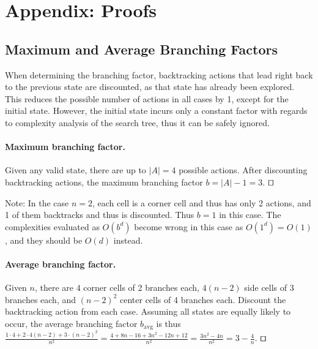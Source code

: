 \documentclass[runningheads]{llncs}
\begin{document}
\section{Appendix: Proofs}
\label{app:proofs}


\subsection{Maximum and Average Branching Factors}
When determining the branching factor, backtracking actions that lead right back to the previous state are discounted, as that state has already been explored. This reduces the possible number of actions in all cases by 1, except for the initial state. However, the initial state incurs only a constant factor with regards to complexity analysis of the search tree, thus it can be safely ignored.

\label{subsec:branchingfactors}
\paragraph{Maximum branching factor.} Given any valid state, there are up to $|A|=4$ possible actions. After discounting backtracking actions, the maximum branching factor $b = |A|-1 = 3$. $\qed$

Note: In the case $n=2$, each cell is a corner cell and thus has only 2 actions, and 1 of them backtracks and thus is discounted. Thus $b = 1$ in this case. The complexities evaluated as $O(b^d)$ become wrong in this case as $O(1^d) = O(1)$, and they should be $O(d)$ instead.

\paragraph{Average branching factor.} Given $n$, there are $4$ corner cells of 2 branches each, $4(n-2)$ side cells of 3 branches each, and $(n-2)^2$ center cells of 4 branches each. Discount the backtracking action from each case. Assuming all states are equally likely to occur, the average branching factor $b_\text{avg}$ is thus $\frac{1\cdot 4 + 2\cdot 4(n-2) + 3\cdot (n-2)^2}{n^2} = \frac{4 + 8n - 16 + 3n^2 - 12n + 12}{n^2} = \frac{3n^2 - 4n}{n^2} = 3 - \frac{4}{n}$. $\qed$
\end{document}
